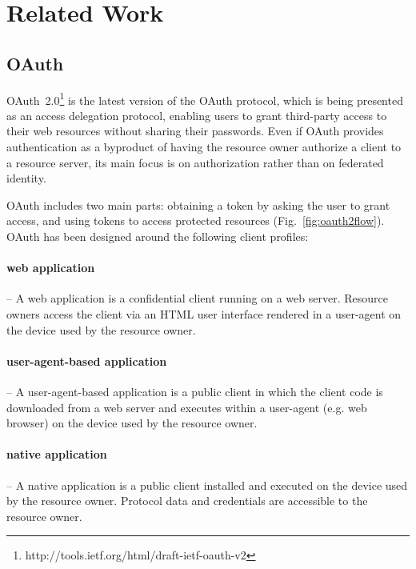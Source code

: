 \documentclass[a4paper]{llncs}
\begin{document}
\section{Related Work}\label{sec:relatedwork}

\subsection{OAuth}

OAuth~2.0\footnote{http://tools.ietf.org/html/draft-ietf-oauth-v2} is the latest version of the OAuth protocol, which is being presented as an access delegation protocol, enabling users to grant third-party access to their web resources without sharing their passwords. Even if OAuth provides authentication as a byproduct of having the resource owner authorize a client to a resource server, its main focus is on authorization rather than on federated identity.


OAuth includes two main parts: obtaining a token by asking the user to grant access, and using tokens to access protected resources (Fig.~\ref{fig:oauth2flow}). OAuth has been designed around the following client profiles:

\paragraph*{web application} -- A web application is a confidential client running on a web server. Resource owners access the client via an HTML user interface rendered in a user-agent on the device used by the resource owner.

\paragraph*{user-agent-based application} -- A user-agent-based application is a public client in which the client code is downloaded from a web server and executes within a user-agent (e.g. web browser) on the device used by the resource owner.

\paragraph*{native application} -- A native application is a public client installed and executed on the device used by the resource owner. Protocol data and credentials are accessible to the resource owner.\\
\end{document}

